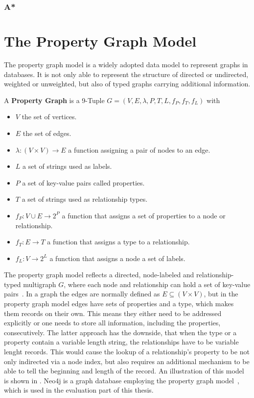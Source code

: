         
        \subsubsection*{A*}
        


\section{The Property Graph Model}\label{\positionnumber}
    The property graph model is a widely adopted data model to represent graphs in databases.
    It is not only able to represent the structure of directed or undirected, weighted or unweighted, but also of typed graphs carrying additional information.

    A \textbf{Property Graph} is a 9-Tuple $G = (V, E, \lambda, P, T, L, f_P, f_T, f_L)$ with 
    \begin{itemize}
        \item $V$ the set of vertices.
        \item $E$ the set of edges.
        \item $\lambda: (V \times V) \rightarrow E$ a function assigning a pair of nodes to an edge.
        \item $L$ a set of strings used as labels.
        \item $P$ a set of key-value pairs called properties.
        \item $T$ a set of strings used as relationship types.
        \item $f_P: V \cup E \rightarrow 2^P$ a function that assigns a set of properties to a node or relationship.
        \item $f_T: E \rightarrow T$ a function that assigns a type to  a relationship.
        \item  $f_L: V \rightarrow 2^L$ a function that assigns a node a set of labels.
    \end{itemize} 
    \smallskip
    The property graph model reflects a directed, node-labeled and relationship-typed multigraph $G$, where each node and relationship can hold a set of key-value pairs~\cite{angles2018property, rodriguez2012graph}.
    In a graph the edges are normally defined as $E \subseteq (V \times V)$, but in the property graph model edges have sets of properties and a type, which makes them records on their own. 
    This means they either need to be addressed explicitly or one needs to store all information, including the properties, consecutively. 
    The latter approach has the downside, that when the type or a property contain a variable length string, the relationships have to be variable lenght records. 
    This would cause the lookup of a relationship's property to be not only indirected via a node index, but also requires an additional mechanism to be able to tell the beginning and length of the record. 
    An illustration of this model is shown in .
    Neo4j is a graph database employing the property graph model~\cite{robinson2015graph}, which is used in the evaluation part of this thesis.
    
